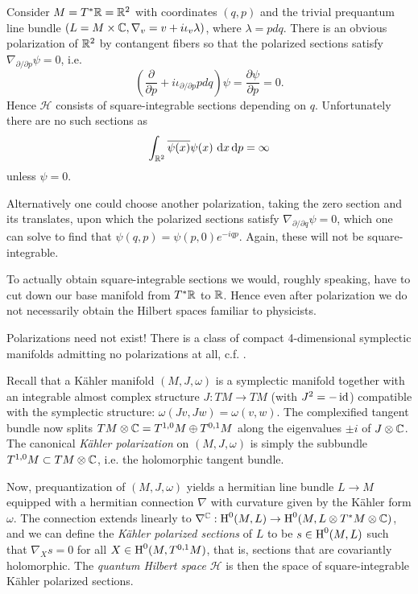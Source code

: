 \documentclass{amsart}
\begin{document}
\begin{example}
    Consider $M=T^*\mathbb{R}=\mathbb{R}^2$ with coordinates $(q,p)$ and the trivial prequantum line bundle
    $(L=M\times\mathbb{C}, \nabla_v=v+i\iota_v\lambda)$, where $\lambda=pdq$.
    There is an obvious polarization of $\mathbb{R}^2$ by contangent fibers so that the polarized sections
    satisfy $\nabla_{\partial/\partial p} \psi = 0$, i.e.
    \begin{equation*}
        \left( \frac{\partial}{\partial p}+i\iota_{\partial/\partial p}pdq \right)\psi=\frac{\partial\psi}{\partial p}=0.
    \end{equation*}
    Hence $\mathcal{H}$ consists of square-integrable sections depending on $q$. Unfortunately
    there are no such sections as
    \begin{equation*}
        \int_{\R^2}\overline{\psi(x)}\psi(x)\d x\d p=\infty
    \end{equation*}
    unless $\psi=0$.

    Alternatively one could choose another polarization, taking the zero section and its translates,
    upon which the polarized sections satisfy $\nabla_{\partial/\partial q}\psi =0$, which one
    can solve to find that $\psi(q,p)=\psi(p,0)e^{-iqp}$. Again, these will not be square-integrable.

    To actually obtain square-integrable sections we would, roughly speaking, have to cut down
    our base manifold from $T^*\mathbb{R}$ to $\mathbb{R}$. Hence even after polarization we do not necessarily
    obtain the Hilbert spaces familiar to physicists.
\end{example}

\begin{remark}
    Polarizations need not exist! There is a class of compact 4-dimensional symplectic manifolds
    admitting no polarizations at all, c.f. \cite{gotay}.
\end{remark}

Recall that a K\"ahler manifold $(M,J,\omega)$ is a symplectic manifold together
with an integrable almost complex structure $J:TM\to TM$ (with $J^2=-\operatorname{id}$) compatible with
the symplectic structure: $\omega(Jv,Jw)=\omega(v,w)$.
The complexified tangent bundle
now splits $TM\otimes\mathbb{C}=T^{1,0}M\oplus T^{0,1}M$ along the eigenvalues $\pm i$ of $J\otimes\mathbb{C}$.
The canonical \textit{K\"ahler polarization} on $(M,J,\omega)$ is simply the subbundle
$T^{1,0}M\subset TM\otimes\mathbb{C}$, i.e. the holomorphic tangent bundle.

Now, prequantization of $(M,J,\omega)$ yields a hermitian line bundle $L\to M$ equipped
with a hermitian connection $\nabla$ with curvature given by the K\"ahler form $\omega$.
The connection extends linearly to $\nabla^{\mathbb{C}}:\operatorname{H}^0(M,L)\to\operatorname{H}^0(M,L\otimes T^*M\otimes\mathbb{C})$,
and we can define the \textit{K\"ahler polarized sections} of $L$ to be $s\in\operatorname{H}^0(M,L)$ such that
$\nabla_Xs=0$ for all $X\in\operatorname{H}^0(M,T^{0,1}M)$, that is, sections that are covariantly holomorphic.
The \textit{quantum Hilbert space} $\mathcal{H}$ is then the space of square-integrable K\"ahler
polarized sections.
\end{document}
